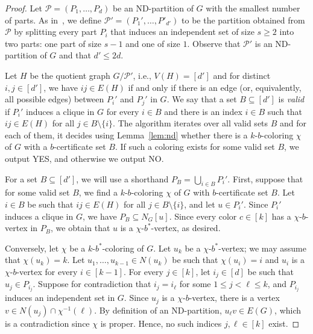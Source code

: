 \documentclass[runningheads, envcountsame]{llncs}
\newcommand{\seq}{\subseteq}
\newcommand{\ca}{\mathcal}
\begin{document}
\begin{proof}
Let $\ca P = (P_1, \ldots, P_d)$ be an ND-partition of $G$ with the smallest number of parts.
As in~\cite[Theorem 16]{JaffkeLS23}, we define $\ca P' = (P_1', \ldots, P'_{d'})$ to be the partition obtained from $\ca P$ by splitting every part $P_i$ that induces an independent set of size $s \ge 2$ into two parts: one part of size $s-1$ and one of size $1$.
Observe that $\ca P'$ is an ND-partition of $G$ and that $d' \le 2d$.

Let $H$ be the quotient graph $G/\ca P'$, i.e., $V(H) = [d']$ and for distinct $i,j \in [d']$, we have $ij \in E(H)$ if and only if there is an edge (or, equivalently, all possible edges) between $P_i'$ and $P_j'$ in $G$.
We say that a set $B \seq [d']$ is \emph{valid} if $P_i'$ induces a clique in $G$ for every $i \in B$ and there is an index $i \in B$ such that $ij \in E(H)$ for all $j \in B \setminus \{i\}$.
The algorithm iterates over all valid sets $B$ and for each of them, it decides using Lemma~\ref{lem:nd} whether there is a $k$-$b$-coloring $\chi$ of $G$ with a $b$-certificate set $B$.
If such a coloring exists for some valid set $B$, we output YES, and otherwise we output NO.

For a set $B \seq [d']$, we will use a shorthand $P_B = \bigcup_{i\in B} P_i'$.
First, suppose that for some valid set $B$, we find a $k$-$b$-coloring $\chi$ of $G$ with $b$-certificate set $B$.
Let $i \in B$ be such that $ij \in E(H)$ for all $j \in B \setminus \{i\}$, and let $u \in P_i'$.
Since $P_i'$ induces a clique in $G$, we have $P_B \seq N_G[u]$.
Since every color $c \in [k]$ has a $\chi$-$b$-vertex in $P_B$, we obtain that $u$ is a $\chi$-$b^*$-vertex, as desired.

Conversely, let $\chi$ be a $k$-$b^*$-coloring of $G$.
Let $u_k$ be a $\chi$-$b^*$-vertex; we may assume that $\chi(u_k) = k$.
Let $u_1, \ldots, u_{k-1} \in N(u_k)$ be such that $\chi(u_i) = i$ and $u_i$ is a $\chi$-$b$-vertex for every $i \in [k-1]$.
For every $j \in [k]$, let $i_j \in [d]$ be such that $u_j \in P_{i_j}$.
Suppose for contradiction that $i_j = i_\ell$ for some $1 \le j < \ell \le k$, and $P_{i_j}$ induces an independent set in $G$.
Since $u_j$ is a $\chi$-$b$-vertex, there is a vertex $v \in N(u_j) \cap \chi^{-1}(\ell)$.
By definition of an ND-partition, $u_{\ell}v \in E(G)$, which is a contradiction since $\chi$ is proper.
Hence, no such indices $j, \ell \in [k]$ exist.


\end{proof}
\end{document}
